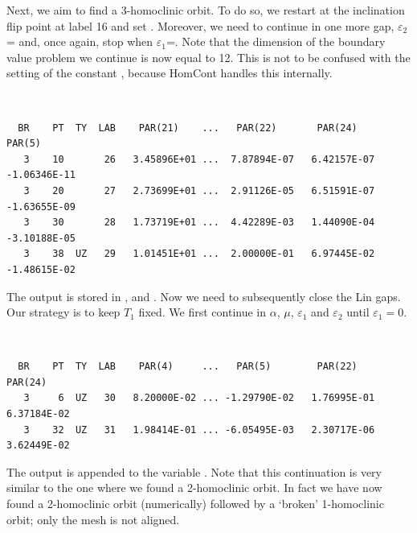\documentclass[12pt]{report}
\begin{document}
Next, we aim to find a 3-homoclinic orbit. To do so, we
restart at the inclination flip point at label 16 and set
. Moreover, we need to continue in one more
gap, $\varepsilon_2$= and, once again, stop
when $\varepsilon_1$=. Note that the 
dimension of the boundary value problem we continue
is now equal to 12. This is not to be confused with the setting
of the \AUTO constant , because {\cal HomCont} handles this
internally.
\begin{center}
 \\
\end{center} 
\begin{verbatim}
  BR    PT  TY  LAB    PAR(21)    ...   PAR(22)       PAR(24)       PAR(5)     
   3    10       26   3.45896E+01 ...  7.87894E-07   6.42157E-07  -1.06346E-11
   3    20       27   2.73699E+01 ...  2.91126E-05   6.51591E-07  -1.63655E-09
   3    30       28   1.73719E+01 ...  4.42289E-03   1.44090E-04  -3.10188E-05
   3    38  UZ   29   1.01451E+01 ...  2.00000E-01   6.97445E-02  -1.48615E-02
\end{verbatim}
The output is stored in ,   and .
Now we need to subsequently close the Lin gaps. Our strategy is to
keep $T_1$ fixed. We first continue in $\alpha$, $\mu$,
$\varepsilon_1$ and $\varepsilon_2$ until $\varepsilon_1=0$.
\begin{center}
 \\
\end{center} 
\begin{verbatim}
  BR    PT  TY  LAB    PAR(4)     ...   PAR(5)        PAR(22)       PAR(24)
   3     6  UZ   30   8.20000E-02 ... -1.29790E-02   1.76995E-01   6.37184E-02
   3    32  UZ   31   1.98414E-01 ... -6.05495E-03   2.30717E-06   3.62449E-02
\end{verbatim}
The output is appended to the \python variable .
Note that this continuation is very similar to the one where we found
a 2-homoclinic orbit. In fact we have now found a 2-homoclinic orbit
(numerically) followed by a `broken' 1-homoclinic orbit; only the mesh
is not aligned.
\end{document}

